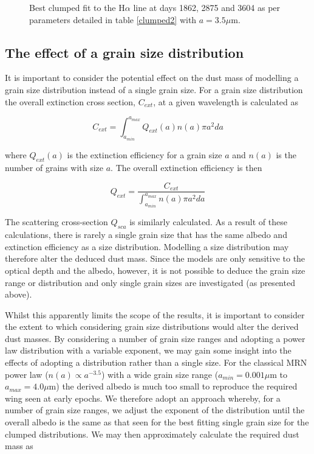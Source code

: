 \documentclass[useAMS,usenatbib,usegraphicx]{mnras}
\begin{document}
\begin{figure}
\begin{center}
\caption{Best clumped fit to the H$\alpha$ line at days 1862, 2875 and 3604 as per parameters detailed in table \ref{clumped2} with $a=3.5\mu$m.}
\label{d1862_3604_cmax}
\end{center}
\end{figure}
\subsection{The effect of a grain size distribution}
\label{gs_distn}
It is important to consider the potential effect on the dust mass of modelling a grain size distribution instead of a single grain size.  For a grain size distribution the overall extinction cross section, $C_{ext}$, at a given wavelength is calculated as

\[ C_{ext}=\int^{a_{max}}_{a_{min}} Q_{ext}(a) n(a) \pi a^2 da \]

where $Q_{ext}(a)$ is the extinction efficiency for a grain size $a$ and $n(a)$ is the number of grains with size $a$. The overall extinction efficiency is then

\[ Q_{ext} = \frac{C_{ext}}{ \int^{a_{max}}_{a_{min}} n(a) \pi a^2 da} \]
 
The scattering cross-section $Q_{sca}$ is similarly calculated.  As a result of these calculations, there is rarely a single grain size that has the same albedo and extinction efficiency as a size distribution.  Modelling a size distribution may therefore alter the deduced dust mass.  Since the models are only sensitive to the optical depth and the albedo, however, it is not possible to deduce the grain size range or distribution and only single grain sizes are investigated (as presented above).

Whilst this apparently limits the scope of the results, it is important to consider the extent to which considering grain size distributions would alter the derived dust masses.  By considering a number of grain size ranges and adopting a power law distribution with a variable exponent, we may gain some insight into the effects of adopting a distribution rather than a single size.  For the classical MRN power law ($n(a) \propto a^{-3.5}$) with a wide grain size range ($a_{min} = 0.001 \mu$m to $a_{max} = 4.0 \mu$m) the derived albedo is much too small to reproduce the required wing seen at early epochs.  We therefore adopt an approach whereby, for a number of grain size ranges, we adjust the exponent of the distribution until the overall albedo is the same as that seen for the best fitting single grain size for the clumped distributions.  We may then approximately calculate the required dust mass as
\end{document}
